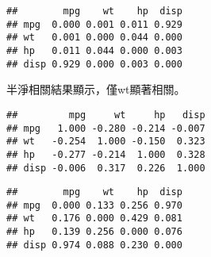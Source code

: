 \documentclass[
]{book}
\newenvironment{Shaded}{\begin{snugshade}}{\end{snugshade}}
\newcommand{\CommentTok}[1]{\textcolor[rgb]{0.56,0.35,0.01}{\textit{#1}}}
\newcommand{\DecValTok}[1]{\textcolor[rgb]{0.00,0.00,0.81}{#1}}
\newcommand{\FunctionTok}[1]{\textcolor[rgb]{0.00,0.00,0.00}{#1}}
\newcommand{\NormalTok}[1]{#1}
\newcommand{\SpecialCharTok}[1]{\textcolor[rgb]{0.00,0.00,0.00}{#1}}
\begin{document}
\begin{Shaded}
\end{Shaded}

\begin{verbatim}
##        mpg    wt    hp  disp
## mpg  0.000 0.001 0.011 0.929
## wt   0.001 0.000 0.044 0.000
## hp   0.011 0.044 0.000 0.003
## disp 0.929 0.000 0.003 0.000
\end{verbatim}

半淨相關結果顯示，僅wt顯著相關。

\begin{Shaded}
\end{Shaded}

\begin{verbatim}
##         mpg     wt     hp   disp
## mpg   1.000 -0.280 -0.214 -0.007
## wt   -0.254  1.000 -0.150  0.323
## hp   -0.277 -0.214  1.000  0.328
## disp -0.006  0.317  0.226  1.000
\end{verbatim}

\begin{Shaded}
\end{Shaded}

\begin{verbatim}
##        mpg    wt    hp  disp
## mpg  0.000 0.133 0.256 0.970
## wt   0.176 0.000 0.429 0.081
## hp   0.139 0.256 0.000 0.076
## disp 0.974 0.088 0.230 0.000
\end{verbatim}
\end{document}
